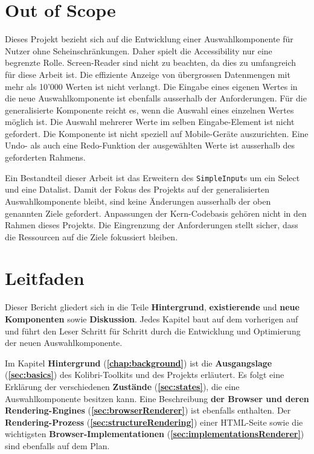\section{Out of Scope}
\label{sec:outOfScope}

Dieses Projekt bezieht sich auf die Entwicklung einer Auswahlkomponente für Nutzer ohne Seheinschränkungen.
Daher spielt die Accessibility nur eine begrenzte Rolle.
Screen-Reader sind nicht zu beachten, da dies zu umfangreich für diese Arbeit ist.
Die effiziente Anzeige von übergrossen Datenmengen mit mehr als 10'000 Werten ist nicht verlangt.
Die Eingabe eines eigenen Wertes in die neue Auswahlkomponente ist ebenfalls ausserhalb der Anforderungen.
Für die generalisierte Komponente reicht es, wenn die Auswahl eines einzelnen Wertes möglich ist.
Die Auswahl mehrerer Werte im selben Eingabe-Element ist nicht gefordert.
Die Komponente ist nicht speziell auf Mobile-Geräte auszurichten. 
Eine Undo- als auch eine Redo-Funktion der ausgewählten Werte ist ausserhalb des geforderten Rahmens. 

Ein Bestandteil dieser Arbeit ist das Erweitern des \texttt{SimpleInput}s um ein Select und eine Datalist.
Damit der Fokus des Projekts auf der generalisierten Auswahlkomponente bleibt, sind keine Änderungen ausserhalb der oben genannten Ziele gefordert.
Anpassungen der Kern-Codebasis gehören nicht in den Rahmen dieses Projekts.
Die Eingrenzung der Anforderungen stellt sicher, dass die Ressourcen auf die Ziele fokussiert bleiben.


\section{Leitfaden}
\label{sec:tocTexted}

Dieser Bericht gliedert sich in die Teile \textbf{Hintergrund}, \textbf{existierende} und \textbf{neue Komponenten} sowie \textbf{Diskussion}.
Jedes Kapitel baut auf dem vorherigen auf und führt den Leser Schritt für Schritt durch die Entwicklung und Optimierung der neuen Auswahlkomponente.

Im Kapitel \textbf{Hintergrund} (\textbf{\ref{chap:background}}) ist die \textbf{Ausgangslage} (\textbf{\ref{sec:basics}}) des Kolibri-Toolkits und des Projekts erläutert.
Es folgt eine Erklärung der verschiedenen \textbf{Zustände} (\textbf{\ref{sec:states}}), die eine Auswahlkomponente besitzen kann. 
Eine Beschreibung \textbf{der Browser und deren Rendering-Engines} (\textbf{\ref{sec:browserRenderer}}) ist ebenfalls enthalten.
Der \textbf{Rendering-Prozess} (\textbf{\ref{sec:structureRendering}}) einer HTML-Seite sowie die wichtigsten \textbf{Browser-Implementationen} (\textbf{\ref{sec:implementationsRenderer}}) sind ebenfalls auf dem Plan.

